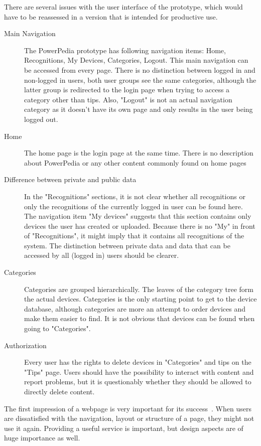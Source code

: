 There are several issues with the user interface of the prototype, which would have to be reassessed in a version that is intended for productive use.
\begin{description}
 \item[Main Navigation] The PowerPedia prototype has following navigation items: Home, Recognitions, My Devices, Categories, Logout. This main navigation can be accessed from every page. There is no distinction between logged in and non-logged in users, both user groups see the same categories, although the latter group is redirected to the login page when trying to access a category other than tips. Also, "Logout" is not an actual navigation category as it doesn't have its own page and only results in the user being logged out.
 \item[Home] The home page is the login page at the same time. There is no description about PowerPedia or any other content commonly found on home pages
 \item[Difference between private and public data] In the "Recognitions" sections, it is not clear whether all recognitions or only the recognitions of the currently logged in user can be found here. The navigation item "My devices" suggests that this section contains only devices the user has created or uploaded. Because there is no "My" in front of "Recognitions", it might imply that it contains all recognitions of the system. The distinction between private data and data that can be accessed by all (logged in) users should be clearer. 
 \item[Categories] Categories are grouped hierarchically. The leaves of the category tree form the actual devices. Categories is the only starting point to get to the device database, although categories are more an attempt to order devices and make them easier to find. It is not obvious that devices can be found when going to "Categories". 
 \item[Authorization] Every user has the rights to delete devices in "Categories" and tips on the "Tips" page. Users should have the possibility to interact with content and report problems, but it is questionably whether they should be allowed to directly delete content. 
\end{description}
The first impression of a webpage is very important for its success~\cite{TODO}. When users are dissatisfied with the navigation, layout or structure of a page, they might not use it again. Providing a useful service is important, but design aspects are of huge importance as well.	








